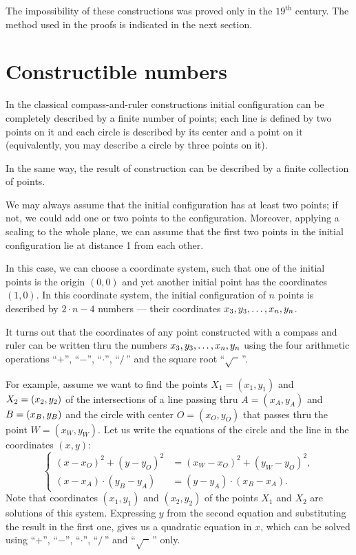 \medskip

The impossibility of these constructions 
was proved only in the $19^\text{th}$ century.
The method used in the proofs is indicated in the next section.

\section{Constructible numbers}

In the classical compass-and-ruler constructions initial configuration can be completely described by a finite number of points;
each line is defined by two points on it and each circle is described by its center and a point on it (equivalently, you may describe a circle by three points on it).

In the same way, the result of construction can be described by a finite collection of points.

We may always assume that the initial configuration has at least two points;
if not, we could add one or two points to the configuration.
Moreover, applying a scaling to the whole plane, we can assume that the first two points in the initial configuration lie at distance 1 from each other.

In this case, we can choose a  coordinate system, such that one of the initial points is the origin $(0,0)$ and yet another initial point has the coordinates~$(1,0)$.
In this coordinate system,
the initial configuration of $n$ points is described by 
$2\cdot n-4$ numbers --- their coordinates $x_3,y_3,\z\dots,x_n,y_n$.

\medskip

It turns out that the coordinates of any point constructed with a compass and ruler
can be written thru the numbers $x_3,y_3,\z\dots,x_n,y_n$ using the four arithmetic operations ``$+$'', ``$-$'', ``$\cdot$'', ``$/\,$''
and the square root ``$\sqrt{\phantom{a}}\,$''.

For example, assume we want to find the points $X_1=(x_1,y_1)$ and $X_2\z=(x_2,y_2)$ of the intersections of 
a line passing thru $A=(x_A,y_A)$ and $B\z=(x_B,y_B)$ and
the circle with center $O=(x_O,y_O)$ that passes thru the point $W=(x_W,y_W)$.
Let us write the equations of the circle and the line in the coordinates $(x,y)$:
$$
\left\{
\begin{aligned}
(x-x_O)^2+(y-y_O)^2&=(x_W-x_O)^2+(y_W-y_O)^2,
\\
(x-x_A)\cdot(y_B-y_A)&=(y-y_A)\cdot(x_B-x_A).
\end{aligned}
\right.
$$
Note that coordinates $(x_1,y_1)$ and $(x_2,y_2)$ of the points $X_1$ and $X_2$ are solutions of this system.
Expressing $y$ from the second equation and substituting the result in the first one, gives us a quadratic equation in $x$, 
which can be solved using ``$+$'', ``$-$'', ``$\cdot$'', ``$/\,$''
and  ``$\sqrt{\phantom{a}}\,$'' only.



